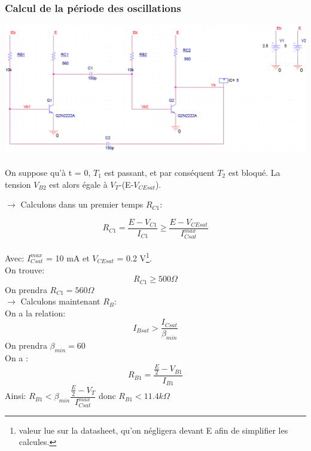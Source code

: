 \documentclass[a4paper]{report}
\begin{document}
\subsubsection{Calcul de la période des oscillations}
\begin{center}
\includegraphics[width=1\textwidth]{multivib.PNG}
\end{center}

\paragraph{}
On suppose qu'à t = 0, $T_1$ est passant, et par conséquent $T_2$ est bloqué. La tension $V_{B2}$ est alors égale à $V_T$-(E-$V_{CEsat}$). \\
\vspace{0.4cm}

$\rightarrow$ Calculons dans un premier temps $R_{C1}$:

$$R_{C1} = \dfrac{E-V_{C1}}{I_{C1}} \geq \dfrac{E-V_{CEsat}}{I_{Csat}^{max}}$$\\

Avec: $I_{Csat}^{max}$ = 10 mA et $V_{CEsat}$ = 0.2 V\footnote{ valeur lue sur la datasheet, qu'on négligera devant E afin de simplifier les calcules.}.\\
On trouve:
$$R_{C1} \geq 500 \Omega$$
On prendra \hspace{5.25cm} \colorbox{lotof}{$R_{C1} = 560 \Omega$} \\

\vspace{0.5cm}
$\rightarrow$ Calculons maintenant $R_B$:\\

On a la relation:
$$I_{Bsat} > \dfrac{I_{Csat}}{\beta _{min}}$$
On prendra $\beta _{min} =60$\\

On a :
$$R_{B1}=\dfrac{\frac{E}{2}-V_{B1}}{I_{B1}}$$
Ainsi: \hspace{2.6cm} $R_{B1} < \beta _{min} \dfrac{\frac{E}{2}-V_{T}}{I_{Csat}^{max}}$ \hspace{0.6cm} donc \hspace{0.6cm} $R_{B1}<11.4k \Omega$\\
\end{document}
